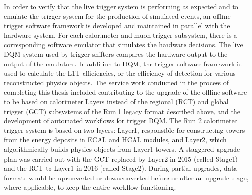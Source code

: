 \indent In order to verify that the live trigger system is performing as expected and to emulate the trigger system for the production of simulated events, an offline trigger software framework is developed and maintained in parallel with the hardware system. For each calorimeter and muon trigger subsystem, there is a corresponding software emulator that simulates the hardware decisions. The live DQM system used by trigger shifters compares the hardware output to the output of the emulators. In addition to DQM, the trigger software framework is used to calculate the L1T efficiencies, or the efficiency of detection for various reconstructed physics objects. The service work conducted in the process of completing this thesis included contributing to the upgrade of the offline software to be based on calorimeter Layers instead of the regional (RCT) and global trigger (GCT) subsystems of the Run 1 legacy format described above, and the development of automated workflows for trigger DQM. The Run 2 calorimeter trigger system is based on two layers: Layer1, responsible for constructing towers from the energy deposits in ECAL and HCAL modules, and Layer2, which algorithmically builds physics objects from Layer1 towers. A staggered upgrade plan was carried out with the GCT replaced by Layer2 in 2015 (called Stage1) and the RCT to Layer1 in 2016 (called Stage2). During partial upgrades, data formats would be upconverted or downconverted before or after an upgrade stage, where applicable, to keep the entire workflow functioning. 

